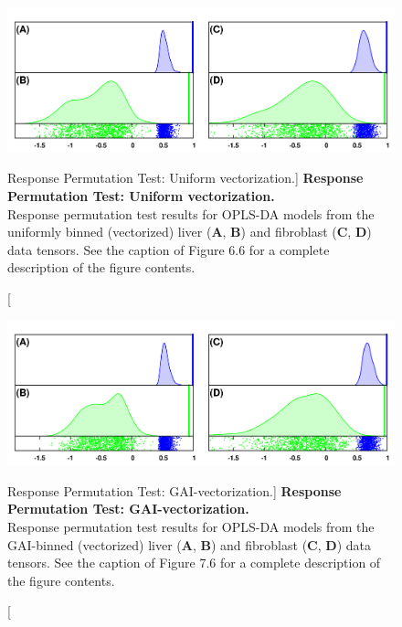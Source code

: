 \begin{figure}[ht!]
\includegraphics[width=6.5in]{figs/gaibin/08-perm-unif-vec.png}
\caption
      [Response Permutation Test: Uniform vectorization.]{
  {\bf Response Permutation Test: Uniform vectorization.}
  \\
  Response permutation test results for OPLS-DA models from the uniformly
  binned (vectorized) liver ({\bf A}, {\bf B}) and fibroblast
  ({\bf C}, {\bf D}) data tensors. See the caption of Figure 6.6 for a
  complete description of the figure contents.
}
\end{figure}

\begin{figure}[ht!]
\includegraphics[width=6.5in]{figs/gaibin/09-perm-gai-vec.png}
\caption
      [Response Permutation Test: GAI-vectorization.]{
  {\bf Response Permutation Test: GAI-vectorization.}
  \\
  Response permutation test results for OPLS-DA models from the GAI-binned
  (vectorized) liver ({\bf A}, {\bf B}) and fibroblast
  ({\bf C}, {\bf D}) data tensors. See the caption of Figure 7.6 for a
  complete description of the figure contents.
}
\end{figure}

\pagebreak



